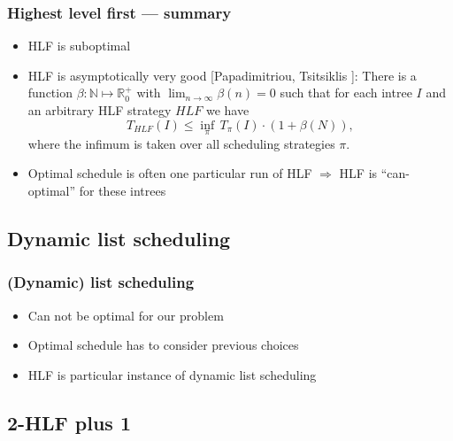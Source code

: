 \documentclass{beamer}
\newcommand{\todo}[1]{ {\color{red}{#1} }}
\begin{document}
\begin{frame}
  \frametitle{Highest level first --- summary}
  \begin{itemize}
  \item HLF is suboptimal
  \item HLF is asymptotically very good [Papadimitriou, Tsitsiklis\todo{Zitieren?}]: 
    \label{thm:quality-hlf-papadimitriou}
    There is a function $\beta: \mathbb{N} \mapsto \mathbb{R}^+_0$ with $\lim_{n\rightarrow \infty} \beta(n) = 0$ such that for each intree $I$ and an arbitrary HLF strategy $HLF$ we have
    \begin{equation*}
      T_{HLF}(I) \leq \inf_\pi\, T_{\pi}(I) \cdot \left( 1+\beta(N) \right),
    \end{equation*}
    where the infimum is taken over all scheduling strategies $\pi$.
  \item Optimal schedule is often one particular run of HLF\todo{Wie oft -- kurze Tabelle in Anhang!} $\Rightarrow$ HLF is ``can-optimal'' for these intrees
  \end{itemize}
\end{frame}

\subsection{Dynamic list scheduling}

\begin{frame}
  \frametitle{(Dynamic) list scheduling}
  \begin{itemize}
  \item Can not be optimal for our problem
  \item Optimal schedule has to consider previous choices
  \item HLF is particular instance of dynamic list scheduling
  \end{itemize}
\end{frame}

\subsection{2-HLF plus 1}
\end{document}
